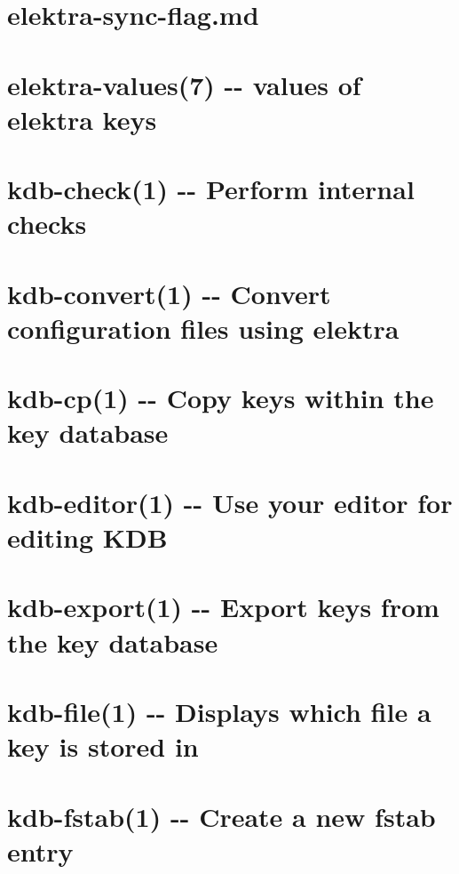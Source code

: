 \documentclass[twoside]{book}
\newcommand{\+}{\discretionary{\mbox{\scriptsize$\hookleftarrow$}}{}{}}
\begin{document}
\chapter{elektra-\/sync-\/flag.md}
\label{doc_help_elektra-sync-flag_md}
\hypertarget{doc_help_elektra-sync-flag_md}{}

\chapter{elektra-\/values(7) -\/-\/ values of elektra keys}
\label{md_doc_help_elektra-values}
\hypertarget{md_doc_help_elektra-values}{}

\chapter{kdb-\/check(1) -\/-\/ Perform internal checks}
\label{md_doc_help_kdb-check}
\hypertarget{md_doc_help_kdb-check}{}

\chapter{kdb-\/convert(1) -\/-\/ Convert configuration files using elektra}
\label{md_doc_help_kdb-convert}
\hypertarget{md_doc_help_kdb-convert}{}

\chapter{kdb-\/cp(1) -\/-\/ Copy keys within the key database}
\label{md_doc_help_kdb-cp}
\hypertarget{md_doc_help_kdb-cp}{}

\chapter{kdb-\/editor(1) -\/-\/ Use your editor for editing K\+D\+B}
\label{md_doc_help_kdb-editor}
\hypertarget{md_doc_help_kdb-editor}{}

\chapter{kdb-\/export(1) -\/-\/ Export keys from the key database}
\label{md_doc_help_kdb-export}
\hypertarget{md_doc_help_kdb-export}{}

\chapter{kdb-\/file(1) -\/-\/ Displays which file a key is stored in}
\label{md_doc_help_kdb-file}
\hypertarget{md_doc_help_kdb-file}{}

\chapter{kdb-\/fstab(1) -\/-\/ Create a new fstab entry}
\label{md_doc_help_kdb-fstab}
\hypertarget{md_doc_help_kdb-fstab}{}

\end{document}
